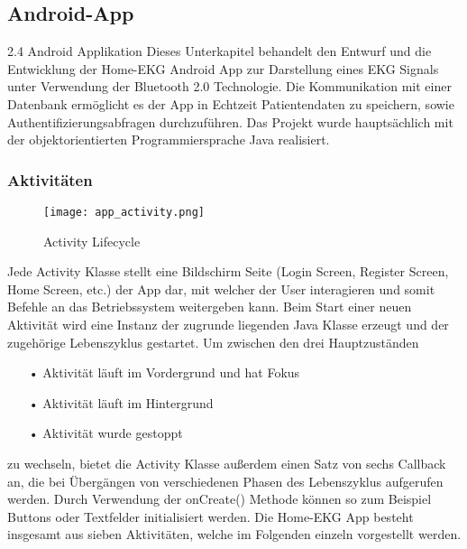 
\subsection{Android-App}
2.4 Android Applikation
Dieses Unterkapitel behandelt den Entwurf und die Entwicklung der Home-EKG Android App zur Darstellung eines EKG Signals unter Verwendung der Bluetooth 2.0 Technologie. Die Kommunikation mit einer Datenbank ermöglicht es der App in Echtzeit Patientendaten zu speichern, sowie Authentifizierungsabfragen durchzuführen. Das Projekt wurde hauptsächlich mit der objektorientierten Programmiersprache Java realisiert. 

\subsubsection{Aktivitäten}
\begin{wrapfigure}[11]{R}{0.35\textwidth}
\vspace{-25pt}
\texttt{[image: app\_activity.png]}
\caption{Activity Lifecycle}
\end{wrapfigure} 
Jede Activity Klasse stellt eine Bildschirm Seite (Login Screen, Register Screen, Home Screen, etc.) der App dar, mit welcher der User interagieren und somit Befehle an das Betriebssystem weitergeben kann. Beim Start einer neuen Aktivität wird eine Instanz der zugrunde liegenden Java Klasse erzeugt und der zugehörige Lebenszyklus gestartet.
Um zwischen den drei Hauptzuständen
\begin{itemize}
\item[•] Aktivität läuft im Vordergrund und hat Fokus
\item[•] Aktivität läuft im Hintergrund
\item[•] Aktivität wurde gestoppt
\end{itemize}
zu wechseln, bietet die Activity Klasse außerdem einen Satz von sechs Callback an, die bei Übergängen von verschiedenen Phasen des Lebenszyklus aufgerufen werden. Durch Verwendung der onCreate() Methode können so zum Beispiel Buttons oder Textfelder initialisiert werden.
Die Home-EKG App besteht insgesamt aus sieben Aktivitäten, welche im Folgenden einzeln vorgestellt werden.


